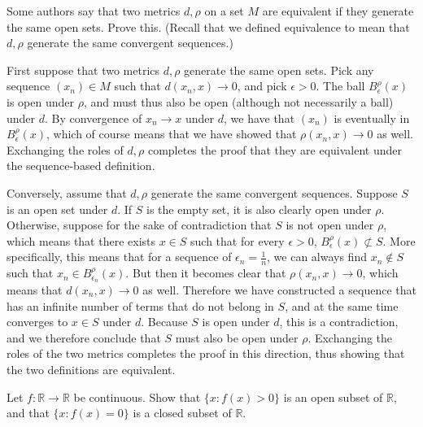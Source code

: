 \newpage

\begin{exercise}{3}
    Some authors say that two metrics $d, \rho$ on a set $M$ are equivalent if they generate the same open sets.
    Prove this.
    (Recall that we defined equivalence to mean that $d, \rho$ generate the same convergent sequences.)
\end{exercise}

\begin{solution}
    
    First suppose that two metrics $d, \rho$ generate the same open sets.
    Pick any sequence $(x_n) \in M$ such that $d(x_n, x) \rightarrow 0$, and pick $\epsilon > 0$.
    The ball $B_{\epsilon}^{\rho}(x)$ is open under $\rho$, and must thus also be open (although not necessarily a ball) under $d$.
    By convergence of $x_n \rightarrow x$ under $d$, we have that $(x_n)$ is eventually in $B_{\epsilon}^{\rho}(x)$, which of course means that we have showed that $\rho(x_n, x) \rightarrow 0$ as well.
    Exchanging the roles of $d, \rho$ completes the proof that they are equivalent under the sequence-based definition.

    Conversely, assume that $d, \rho$ generate the same convergent sequences.
    Suppose $S$ is an open set under $d$.
    If $S$ is the empty set, it is also clearly open under $\rho$.
    Otherwise, suppose for the sake of contradiction that $S$ is not open under $\rho$, which means that there exists $x \in S$ such that for every $\epsilon > 0$, $B_{\epsilon}^{\rho}(x) \not\subset S$.
    More specifically, this means that for a sequence of $\epsilon_n = \frac{1}{n}$, we can always find $x_n \notin S$ such that $x_n \in B_{\epsilon_n}^{\rho}(x)$.
    But then it becomes clear that $\rho(x_n, x) \rightarrow 0$, which means that $d(x_n, x) \rightarrow 0$ as well.
    Therefore we have constructed a sequence that has an infinite number of terms that do not belong in $S$, and at the same time converges to $x \in S$ under $d$.
    Because $S$ is open under $d$, this is a contradiction, and we therefore conclude that $S$ must also be open under $\rho$.
    Exchanging the roles of the two metrics completes the proof in this direction, thus showing that the two definitions are equivalent.
\end{solution}

\begin{exercise}{5}
    Let $f: \mathbb{R} \rightarrow \mathbb{R}$ be continuous.
    Show that $\{x: f(x) > 0\}$ is an open subset of $\mathbb{R}$, and that $\{x: f(x) = 0\}$ is a closed subset of $\mathbb{R}$.
\end{exercise}


